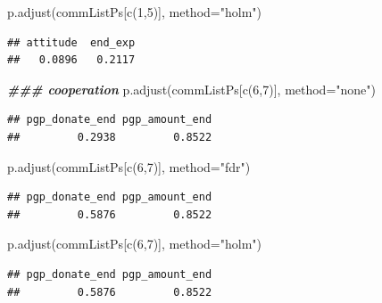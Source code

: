 \documentclass[
]{article}
\newenvironment{Shaded}{\begin{snugshade}}{\end{snugshade}}
\newcommand{\AttributeTok}[1]{\textcolor[rgb]{0.77,0.63,0.00}{#1}}
\newcommand{\DecValTok}[1]{\textcolor[rgb]{0.00,0.00,0.81}{#1}}
\newcommand{\DocumentationTok}[1]{\textcolor[rgb]{0.56,0.35,0.01}{\textbf{\textit{#1}}}}
\newcommand{\FunctionTok}[1]{\textcolor[rgb]{0.00,0.00,0.00}{#1}}
\newcommand{\NormalTok}[1]{#1}
\newcommand{\StringTok}[1]{\textcolor[rgb]{0.31,0.60,0.02}{#1}}
\begin{document}
\begin{Shaded}
\begin{Highlighting}[]
\FunctionTok{p.adjust}\NormalTok{(commListPs[}\FunctionTok{c}\NormalTok{(}\DecValTok{1}\NormalTok{,}\DecValTok{5}\NormalTok{)], }\AttributeTok{method=}\StringTok{"holm"}\NormalTok{)}
\end{Highlighting}
\end{Shaded}

\begin{verbatim}
## attitude  end_exp 
##   0.0896   0.2117
\end{verbatim}

\begin{Shaded}
\begin{Highlighting}[]
\DocumentationTok{\#\#\# cooperation}
\FunctionTok{p.adjust}\NormalTok{(commListPs[}\FunctionTok{c}\NormalTok{(}\DecValTok{6}\NormalTok{,}\DecValTok{7}\NormalTok{)], }\AttributeTok{method=}\StringTok{"none"}\NormalTok{)}
\end{Highlighting}
\end{Shaded}

\begin{verbatim}
## pgp_donate_end pgp_amount_end 
##         0.2938         0.8522
\end{verbatim}

\begin{Shaded}
\begin{Highlighting}[]
\FunctionTok{p.adjust}\NormalTok{(commListPs[}\FunctionTok{c}\NormalTok{(}\DecValTok{6}\NormalTok{,}\DecValTok{7}\NormalTok{)], }\AttributeTok{method=}\StringTok{"fdr"}\NormalTok{)}
\end{Highlighting}
\end{Shaded}

\begin{verbatim}
## pgp_donate_end pgp_amount_end 
##         0.5876         0.8522
\end{verbatim}

\begin{Shaded}
\begin{Highlighting}[]
\FunctionTok{p.adjust}\NormalTok{(commListPs[}\FunctionTok{c}\NormalTok{(}\DecValTok{6}\NormalTok{,}\DecValTok{7}\NormalTok{)], }\AttributeTok{method=}\StringTok{"holm"}\NormalTok{)}
\end{Highlighting}
\end{Shaded}

\begin{verbatim}
## pgp_donate_end pgp_amount_end 
##         0.5876         0.8522
\end{verbatim}
\end{document}
